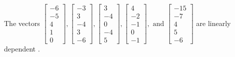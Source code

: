 \begin{exercise}
\begin{exerciseStatement}
  \end{exerciseStatement}
  \begin{exerciseAnswer}
   The vectors \(\left[\begin{array}{r}
-6 \\
-5 \\
4 \\
1 \\
0
\end{array}\right] , \left[\begin{array}{r}
-3 \\
3 \\
-4 \\
3 \\
-6
\end{array}\right] , \left[\begin{array}{r}
3 \\
-4 \\
0 \\
-4 \\
5
\end{array}\right] , \left[\begin{array}{r}
4 \\
-2 \\
-1 \\
0 \\
-1
\end{array}\right] , \text{ and } \left[\begin{array}{r}
-15 \\
-7 \\
4 \\
5 \\
-6
\end{array}\right]\) are 
  	 linearly dependent  .
  


  \end{exerciseAnswer}
\end{exercise}